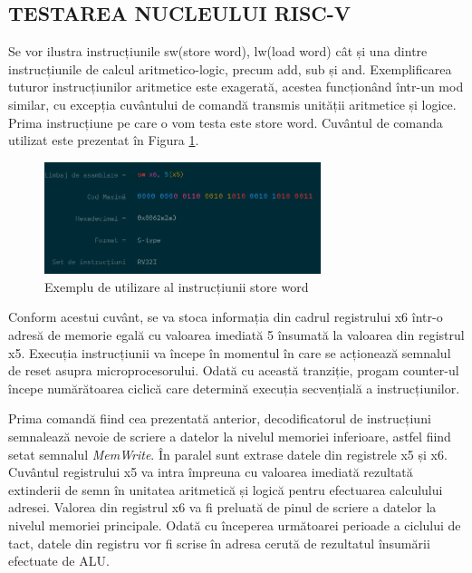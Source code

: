 \documentclass[12pt]{article}
\begin{document}
\subsection{TESTAREA NUCLEULUI RISC-V}
Se vor ilustra instrucțiunile sw(store word), lw(load word) cât și una dintre instrucțiunile de calcul aritmetico-logic, precum add, sub și and. Exemplificarea tuturor instrucțiunilor aritmetice este exagerată, acestea funcționând într-un mod similar, cu excepția cuvântului de comandă transmis unității aritmetice și logice. Prima instrucțiune pe care o vom testa este store word. Cuvântul de comanda utilizat este prezentat în Figura \ref{Figura:65}.

  \begin{figure}[h!]
 \hspace*{-0.1cm}\includegraphics[width=0.72\textwidth]{swtype.png}
 \centering
 \caption{Exemplu de utilizare al instrucțiunii store word}
 \label{Figura:65}
 \end{figure}
 
Conform acestui cuvânt, se va stoca informația din cadrul registrului x6 într-o adresă de memorie egală cu valoarea imediată 5 însumată la valoarea din registrul x5. Execuția instrucțiunii va începe în momentul în care se acționează semnalul de reset asupra microprocesorului. Odată cu această tranziție, progam counter-ul începe numărătoarea ciclică care determină execuția secvențială a instrucțiunilor.

Prima comandă fiind cea prezentată anterior, decodificatorul de instrucțiuni semnalează nevoie de scriere a datelor la nivelul memoriei inferioare, astfel fiind setat semnalul \textit{MemWrite}. În paralel sunt extrase datele din registrele x5 și x6. Cuvântul registrului x5 va intra împreuna cu valoarea imediată rezultată extinderii de semn în unitatea aritmetică și logică pentru efectuarea calculului adresei. Valorea din registrul x6 va fi preluată de pinul de scriere a datelor la nivelul memoriei principale. 
Odată cu începerea următoarei perioade a ciclului de tact, datele din registru vor fi scrise în adresa cerută de rezultatul însumării efectuate de ALU.
 
\end{document}
